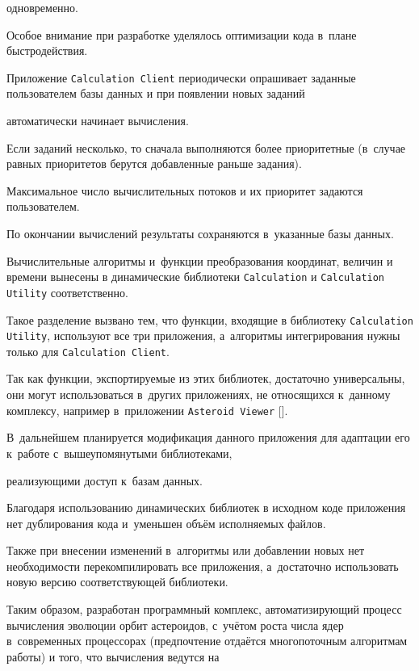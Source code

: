 одновременно. 

Особое внимание при разработке уделялось оптимизации кода в~плане быстродействия.



Приложение {\tt Calculation Client} периодически опрашивает заданные пользователем базы данных и при появлении новых заданий

автоматически начинает вычисления. 

Если заданий несколько, то сначала выполняются более приоритетные (в~случае равных приоритетов берутся добавленные раньше задания). 

Максимальное число вычислительных потоков и их приоритет задаются пользователем. 

По окончании вычислений результаты сохраняются в~указанные базы данных.



Вычислительные алгоритмы и~функции преобразования координат, величин и времени вынесены в динамические библиотеки {\tt Calculation} и {\tt Calculation Utility} соответственно. 

Такое разделение вызвано тем, что функции, входящие в библиотеку {\tt Calculation Utility}, используют все три приложения, а~алгоритмы интегрирования нужны только для {\tt Calculation Client}. 

Так как функции, экспортируемые из этих библиотек, достаточно универсальны, они могут использоваться в~других приложениях, не относящихся к~данному комплексу, например в~приложении {\tt Asteroid Viewer} []. 

В~дальнейшем планируется модификация данного приложения для адаптации его к~работе с~вышеупомянутыми библиотеками,

реализующими доступ к~базам данных.



Благодаря использованию динамических библиотек в исходном коде приложения нет дублирования кода и~уменьшен объём исполняемых файлов. 

Также при внесении изменений в~алгоритмы или добавлении новых нет необходимости перекомпилировать все приложения, а~достаточно использовать новую версию соответствующей библиотеки.



Таким образом, разработан программный комплекс, автоматизирующий процесс вычисления эволюции орбит астероидов, с~учётом роста числа ядер в~современных процессорах (предпочтение отдаётся многопоточным алгоритмам работы) и того, что вычисления ведутся на

